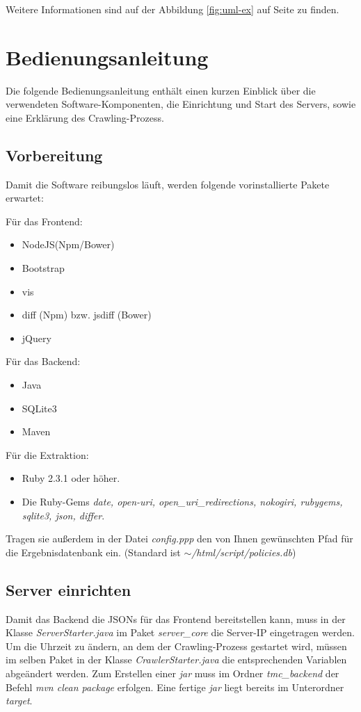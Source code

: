 \documentclass{article}
\begin{document}
	Weitere Informationen sind auf der Abbildung \ref{fig:uml-ex} auf Seite \pageref{fig:uml-ex} zu finden.
	
	\section{Bedienungsanleitung}
	Die folgende Bedienungsanleitung enthält einen kurzen Einblick über die verwendeten Software-Komponenten, die Einrichtung und Start des Servers, sowie eine Erklärung des Crawling-Prozess.
	\subsection{Vorbereitung}
	Damit die Software reibungslos läuft, werden folgende vorinstallierte Pakete erwartet:
	
	Für das Frontend:
	\begin{itemize}
		\item NodeJS(Npm/Bower)
		\item Bootstrap
		\item vis
		\item diff (Npm) bzw. jsdiff (Bower)
		\item jQuery
	\end{itemize}

	Für das Backend:
	\begin{itemize}
		\item Java
		\item SQLite3
		\item Maven
	\end{itemize}

	Für die Extraktion:
	\begin{itemize}
		\item Ruby 2.3.1 oder höher.
		\item Die Ruby-Gems \textit{date, open-uri, open\_uri\_redirections, nokogiri, rubygems, sqlite3, json, differ}.
	\end{itemize}

	Tragen sie außerdem in der Datei \textit{config.ppp} den von Ihnen gewünschten Pfad für die Ergebnisdatenbank ein. (Standard ist \textit{$\sim$/html/script/policies.db}) 
	\subsection{Server einrichten}
	Damit das Backend die JSONs für das Frontend bereitstellen kann, muss in der Klasse \textit{ServerStarter.java} im Paket \textit{server\_core} die Server-IP eingetragen werden. Um die Uhrzeit zu ändern, an dem der Crawling-Prozess gestartet wird, müssen im selben Paket in der Klasse \textit{CrawlerStarter.java} die entsprechenden Variablen abgeändert werden.\newline
	Zum Erstellen einer \textit{jar} muss im Ordner \textit{tmc\_backend} der Befehl \textit{mvn clean package} erfolgen. Eine fertige \textit{jar} liegt bereits im Unterordner \textit{target}. 
\end{document}
